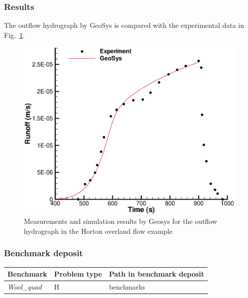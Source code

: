 \subsubsection*{Results}
%
The outflow hydrograph by GeoSys is compared with the experimental data in Fig.~\ref{SFC:resultsWool}.
%
\begin{figure} [htb!]
 \centering
 \includegraphics[width=0.75\columnwidth] {H_SFC/figures/Wool.eps}
 \caption{Measurements and simulation results by Geosys for the outflow hydrograph in the Horton overland flow example}
 \label{SFC:resultsWool}
\end{figure}
%
\subsubsection*{Benchmark deposit}
\begin{tabular}{|l|l|l|}
  \hline
  Benchmark & Problem type & Path in benchmark deposit \\
  \hline
  \emph{Wool\_quad} & H & benchmarks\verb \OVERLAND_FLOW\ \\
 \hline
\end{tabular}


